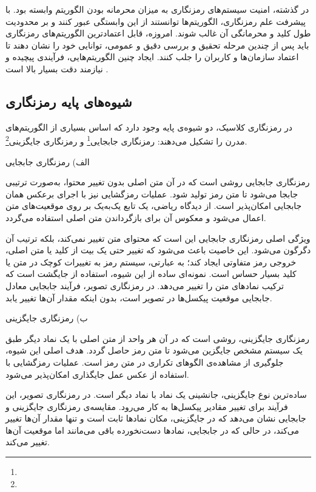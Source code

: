 در گذشته، امنیت سیستم‌های رمزنگاری به میزان محرمانه بودن الگوریتم وابسته بود. با پیشرفت علم رمزنگاری، الگوریتم‌ها توانستند از این وابستگی عبور کنند و بر محدودیت طول کلید و محرمانگی آن غالب شوند. امروزه، قابل اعتمادترین الگوریتم‌های رمزنگاری باید پس از چندین مرحله تحقیق و بررسی دقیق و عمومی، توانایی خود را نشان دهند تا اعتماد سازمان‌ها و کاربران را جلب کنند. ایجاد چنین الگوریتم‌هایی، فرآیندی پیچیده و نیازمند دقت بسیار بالا است \cite{ref21}.

\subsection{شیوه‌های پایه رمزنگاری}

در رمزنگاری کلاسیک، دو شیوه‌ی پایه وجود دارد که اساس بسیاری از الگوریتم‌های مدرن را تشکیل می‌دهند: رمزنگاری جابجایی\footnote{} و رمزنگاری جایگزینی\footnote{}\cite{ref22}.

الف) رمزنگاری جابجایی

رمزنگاری جابجایی روشی است که در آن متن اصلی بدون تغییر محتوا، به‌صورت ترتیبی جابجا می‌شود تا متن رمز تولید شود. عملیات رمزگشایی نیز با اجرای برعکس همان جابجایی امکان‌پذیر است. از دیدگاه ریاضی، یک تابع یک‌به‌یک بر روی موقعیت‌های متن اعمال می‌شود و معکوس آن برای بازگرداندن متن اصلی استفاده می‌گردد.

ویژگی اصلی رمزنگاری جابجایی این است که محتوای متن تغییر نمی‌کند، بلکه ترتیب آن دگرگون می‌شود. این خاصیت باعث می‌شود که تغییر حتی یک بیت از کلید یا متن اصلی، خروجی رمز متفاوتی ایجاد کند؛ به عبارتی، سیستم رمز به تغییرات کوچک در متن یا کلید بسیار حساس است. نمونه‌ای ساده از این شیوه، استفاده از جایگشت  است که ترکیب نمادهای متن را تغییر می‌دهد. در رمزنگاری تصویر، فرآیند جابجایی معادل جابجایی موقعیت پیکسل‌ها در تصویر است، بدون اینکه مقدار آن‌ها تغییر یابد\cite{ref23}.

ب) رمزنگاری جایگزینی

رمزنگاری جایگزینی، روشی است که در آن هر واحد از متن اصلی با یک نماد دیگر طبق یک سیستم مشخص جایگزین می‌شود تا متن رمز حاصل گردد. هدف اصلی این شیوه، جلوگیری از مشاهده‌ی الگوهای تکراری در متن رمز است. عملیات رمزگشایی با استفاده از عکس عمل جایگذاری امکان‌پذیر می‌شود.

ساده‌ترین نوع جایگزینی، جانشینی یک نماد با نماد دیگر است. در رمزنگاری تصویر، این فرآیند برای تغییر مقادیر پیکسل‌ها به کار می‌رود. مقایسه‌ی رمزنگاری جایگزینی و جابجایی نشان می‌دهد که در جایگزینی، مکان نمادها ثابت است و تنها مقدار آن‌ها تغییر می‌کند، در حالی که در جابجایی، نمادها دست‌نخورده باقی می‌مانند اما موقعیت آن‌ها تغییر می‌کند\cite{ref22, ref24}.

